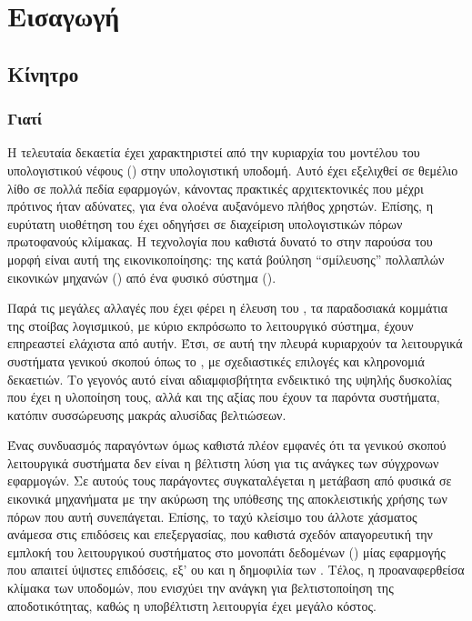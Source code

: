 \chapter{Εισαγωγή}

\section{Κίνητρο}

\subsection{Γιατί }

Η τελευταία δεκαετία έχει χαρακτηριστεί από την κυριαρχία του μοντέλου του
υπολογιστικού νέφους () στην υπολογιστική υποδομή. Αυτό έχει
εξελιχθεί σε θεμέλιο λίθο σε πολλά πεδία εφαρμογών, κάνοντας πρακτικές
αρχιτεκτονικές που μέχρι πρότινος ήταν αδύνατες, για ένα ολοένα αυξανόμενο
πλήθος χρηστών. Επίσης, η ευρύτατη υιοθέτηση του έχει οδηγήσει σε διαχείριση
υπολογιστικών πόρων πρωτοφανούς κλίμακας. Η τεχνολογία που καθιστά δυνατό το
 στην παρούσα του μορφή είναι αυτή της εικονικοποίησης: της κατά
βούληση ``σμίλευσης'' πολλαπλών εικονικών μηχανών () από ένα φυσικό
σύστημα (\host{}).

Παρά τις μεγάλες αλλαγές που έχει φέρει η έλευση του , τα παραδοσιακά
κομμάτια της στοίβας λογισμικού, με κύριο εκπρόσωπο το λειτουργικό σύστημα,
έχουν επηρεαστεί ελάχιστα από αυτήν. Έτσι, σε αυτή την πλευρά κυριαρχούν τα
λειτουργικά συστήματα γενικού σκοπού όπως το \linux{}, με σχεδιαστικές επιλογές
και κληρονομιά δεκαετιών. Το γεγονός αυτό είναι αδιαμφισβήτητα ενδεικτικό της
υψηλής δυσκολίας που έχει η υλοποίηση τους, αλλά και της αξίας που έχουν τα
παρόντα συστήματα, κατόπιν συσσώρευσης μακράς αλυσίδας βελτιώσεων.

Ένας συνδυασμός παραγόντων όμως καθιστά πλέον εμφανές ότι τα γενικού σκοπού
λειτουργικά συστήματα δεν είναι η βέλτιστη λύση για τις ανάγκες των σύγχρονων
εφαρμογών. Σε αυτούς τους παράγοντες συγκαταλέγεται η μετάβαση από φυσικά σε
εικονικά μηχανήματα με την ακύρωση της υπόθεσης της αποκλειστικής χρήσης των
πόρων που αυτή συνεπάγεται. Επίσης, το ταχύ κλείσιμο του άλλοτε χάσματος ανάμεσα
στις επιδόσεις  και επεξεργασίας, που καθιστά σχεδόν απαγορευτική την
εμπλοκή του λειτουργικού συστήματος στο μονοπάτι δεδομένων () μίας
εφαρμογής που απαιτεί ύψιστες επιδόσεις, εξ' ου και η δημοφιλία των \cite{dpdk,
spdk}. Τέλος, η προαναφερθείσα κλίμακα των υποδομών, που ενισχύει την ανάγκη για
βελτιστοποίηση της αποδοτικότητας, καθώς η υποβέλτιστη λειτουργία έχει μεγάλο
κόστος.

